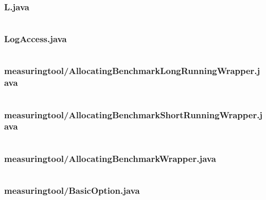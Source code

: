 \documentclass[a4paper,11pt]{article}
\begin{document}
\subsubsection{L.java}
\inputminted[fontsize=\footnotesize, linenos, numbersep=5pt, tabsize=4, frame=topline,framesep=0.8cm]{java}{/home/tituomin/StudioProjects/nativebenchmark/src/fi/helsinki/cs/tituomin/nativebenchmark/L.java}
\vspace{1cm}
\subsubsection{LogAccess.java}
\inputminted[fontsize=\footnotesize, linenos, numbersep=5pt, tabsize=4, frame=topline,framesep=0.8cm]{java}{/home/tituomin/StudioProjects/nativebenchmark/src/fi/helsinki/cs/tituomin/nativebenchmark/LogAccess.java}
\vspace{1cm}
\subsubsection{measuringtool/AllocatingBenchmarkLongRunningWrapper.java}
\inputminted[fontsize=\footnotesize, linenos, numbersep=5pt, tabsize=4, frame=topline,framesep=0.8cm]{java}{/home/tituomin/StudioProjects/nativebenchmark/src/fi/helsinki/cs/tituomin/nativebenchmark/measuringtool/AllocatingBenchmarkLongRunningWrapper.java}
\vspace{1cm}
\subsubsection{measuringtool/AllocatingBenchmarkShortRunningWrapper.java}
\inputminted[fontsize=\footnotesize, linenos, numbersep=5pt, tabsize=4, frame=topline,framesep=0.8cm]{java}{/home/tituomin/StudioProjects/nativebenchmark/src/fi/helsinki/cs/tituomin/nativebenchmark/measuringtool/AllocatingBenchmarkShortRunningWrapper.java}
\vspace{1cm}
\subsubsection{measuringtool/AllocatingBenchmarkWrapper.java}
\inputminted[fontsize=\footnotesize, linenos, numbersep=5pt, tabsize=4, frame=topline,framesep=0.8cm]{java}{/home/tituomin/StudioProjects/nativebenchmark/src/fi/helsinki/cs/tituomin/nativebenchmark/measuringtool/AllocatingBenchmarkWrapper.java}
\vspace{1cm}
\subsubsection{measuringtool/BasicOption.java}
\inputminted[fontsize=\footnotesize, linenos, numbersep=5pt, tabsize=4, frame=topline,framesep=0.8cm]{java}{/home/tituomin/StudioProjects/nativebenchmark/src/fi/helsinki/cs/tituomin/nativebenchmark/measuringtool/BasicOption.java}
\vspace{1cm}
\end{document}
